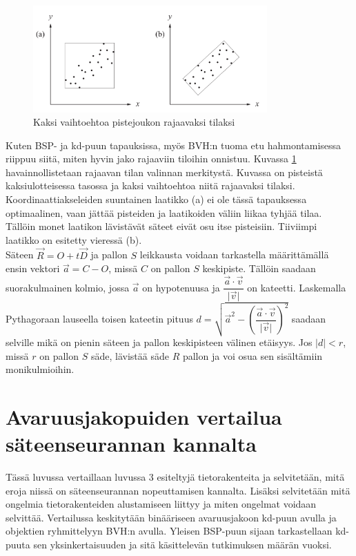 \documentclass[a4paper, 12pt, titlepage]{article}
\newcommand{\abs}[1]{\vert #1 \vert} %
\begin{document}
\begin{figure}[htp]
 \centering 
 \includegraphics[width=0.8\textwidth]{img/bvh1.png}
 \vspace{0.4cm}
 \caption{Kaksi vaihtoehtoa pistejoukon rajaavaksi tilaksi \citep{lengyel}}%
 \label{bvh1}
\end{figure}

Kuten BSP- ja kd-puun tapauksissa, myös BVH:n tuoma etu hahmontamisessa riippuu siitä, miten hyvin jako rajaaviin tiloihin onnistuu. Kuvassa \ref{bvh1} havainnollistetaan rajaavan tilan valinnan merkitystä. Kuvassa on pisteistä kaksiulotteisessa tasossa ja kaksi vaihtoehtoa niitä rajaavaksi tilaksi. Koordinaattiakseleiden suuntainen laatikko (a) ei ole tässä tapauksessa optimaalinen, vaan jättää pisteiden ja laatikoiden väliin liikaa tyhjää tilaa. Tällöin monet laatikon lävistävät säteet eivät osu itse pisteisiin. Tiiviimpi laatikko on esitetty vieressä (b).\\


Säteen $\vec{R}=O+t\vec{D}$ ja pallon $S$ leikkausta voidaan tarkastella määrittämällä ensin vektori $\vec{a} = C - O$, missä $C$ on pallon $S$ keskipiste. Tällöin saadaan suorakulmainen kolmio, jossa $\vec{a}$ on hypotenuusa ja $\dfrac{\vec{a}\cdot\vec{v}}{\abs{\vec{v}}}$ on kateetti. Laskemalla Pythagoraan lauseella toisen kateetin pituus $d = \sqrt{\vec{a}^2 - \left(\dfrac{\vec{a}\cdot\vec{v}}{\abs{\vec{v}}}\right)^2}$ saadaan selville mikä on pienin säteen ja pallon keskipisteen välinen etäisyys. Jos $\abs{d} < r$, missä $r$ on pallon $S$ säde, lävistää säde $R$ pallon ja voi osua sen sisältämiin monikulmioihin. \citep[.]{janke}    


\newpage
\section{Avaruusjakopuiden vertailua säteenseurannan kannalta}

Tässä luvussa vertaillaan luvussa 3 esiteltyjä tietorakenteita ja selvitetään, mitä eroja niissä on säteenseurannan nopeuttamisen kannalta. Lisäksi selvitetään mitä ongelmia tietorakenteiden alustamiseen liittyy ja miten ongelmat voidaan selvittää. Vertailussa keskitytään binääriseen avaruusjakoon kd-puun avulla ja objektien ryhmittelyyn BVH:n avulla. Yleisen BSP-puun sijaan tarkastellaan kd-puuta sen yksinkertaisuuden ja sitä käsittelevän tutkimuksen määrän vuoksi.
\end{document}
